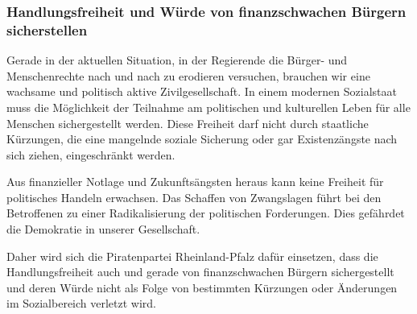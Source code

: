 \subsubsection{Handlungsfreiheit und Würde von finanzschwachen Bürgern sicherstellen}
\abstimmung
Gerade in der aktuellen Situation, in der Regierende die Bürger- und Menschenrechte nach und nach zu erodieren versuchen, brauchen wir eine wachsame und politisch aktive Zivilgesellschaft. In einem modernen Sozialstaat muss die Möglichkeit der Teilnahme am politischen und kulturellen Leben für alle Menschen sichergestellt werden. Diese Freiheit darf nicht durch staatliche Kürzungen, die eine mangelnde soziale Sicherung oder gar Existenzängste nach sich ziehen, eingeschränkt werden.

Aus finanzieller Notlage und Zukunftsängsten heraus kann keine Freiheit für politisches Handeln erwachsen. Das Schaffen von Zwangslagen führt bei den Betroffenen zu einer Radikalisierung der politischen Forderungen. Dies gefährdet die Demokratie in unserer Gesellschaft.

Daher wird sich die Piratenpartei Rheinland-Pfalz dafür einsetzen, dass die Handlungsfreiheit auch und gerade von finanzschwachen Bürgern sichergestellt und deren Würde nicht als Folge von bestimmten Kürzungen oder Änderungen im Sozialbereich verletzt wird.